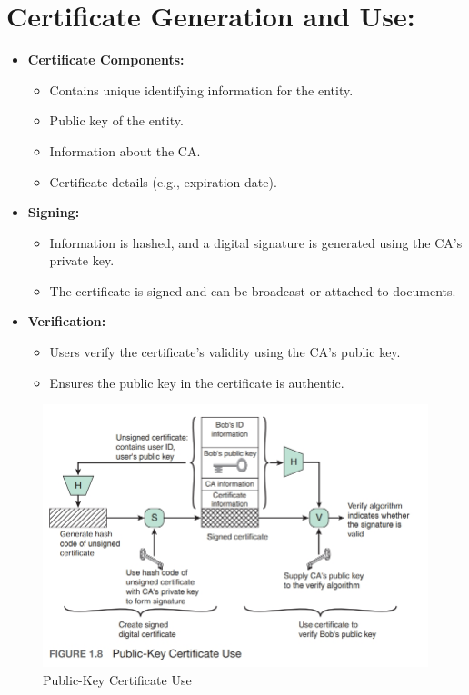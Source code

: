 \section{Certificate Generation and Use:}
\begin{itemize}
    \item \textbf{Certificate Components:}
    \begin{itemize}
        \item Contains unique identifying information for the entity.
        \item Public key of the entity.
        \item Information about the CA.
        \item Certificate details (e.g., expiration date).
    \end{itemize}
    \item \textbf{Signing:}
    \begin{itemize}
        \item Information is hashed, and a digital signature is generated using the CA’s private key.
        \item The certificate is signed and can be broadcast or attached to documents.
    \end{itemize}
    \item \textbf{Verification:}
    \begin{itemize}
        \item Users verify the certificate's validity using the CA’s public key.
        \item Ensures the public key in the certificate is authentic.
    \end{itemize}
\end{itemize}
\begin{figure}
    \centering
    \includegraphics[width=1\linewidth]{Data_Privacy_and_Cryptography/Figures/public key certificate use.jpeg}
    \caption{Public-Key Certificate Use}
    \label{fig:pkcertificate}
\end{figure}

